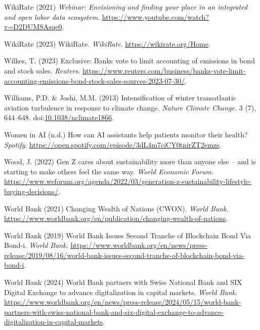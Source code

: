 \documentclass[
  letterpaper,
  DIV=11,
  numbers=noendperiod]{scrartcl}
\newlength{\cslhangindent}
\newenvironment{CSLReferences}[2] %
 {\begin{list}{}{%
  \setlength{\itemindent}{0pt}
  \setlength{\leftmargin}{0pt}
  \setlength{\parsep}{0pt}
  \ifodd #1
   \setlength{\leftmargin}{\cslhangindent}
   \setlength{\itemindent}{-1\cslhangindent}
  \fi
  \setlength{\itemsep}{#2\baselineskip}}}
 {\end{list}}
\begin{document}
\begin{CSLReferences}{0}{1}
WikiRate (2021) \emph{Webinar: {Envisioning} and finding your place in
an integrated and open labor data ecosystem}.
\url{https://www.youtube.com/watch?v=D2DUMSAsqe0}.

WikiRate (2023) {WikiRate}. \emph{WikiRate}.
\url{https://wikirate.org/Home}.

Wilkes, T. (2023) Exclusive: {Banks} vote to limit accounting of
emissions in bond and stock sales. \emph{Reuters}.
\url{https://www.reuters.com/business/banks-vote-limit-accounting-emissions-bond-stock-sales-sources-2023-07-30/}.

Williams, P.D. \& Joshi, M.M. (2013) Intensification of winter
transatlantic aviation turbulence in response to climate change.
\emph{Nature Climate Change}. 3 (7), 644--648.
doi:\href{https://doi.org/10.1038/nclimate1866}{10.1038/nclimate1866}.

Women in AI (n.d.) How can {AI} assistants help patients monitor their
health? \emph{Spotify}.
\url{https://open.spotify.com/episode/3dL4m7ciCY0tnirZT2emzs}.

Wood, J. (2022) Gen {Z} cares about sustainability more than anyone else
-- and is starting to make others feel the same way. \emph{World
Economic Forum}.
\url{https://www.weforum.org/agenda/2022/03/generation-z-sustainability-lifestyle-buying-decisions/}.

World Bank (2021) Changing {Wealth} of {Nations} ({CWON}). \emph{World
Bank}.
\url{https://www.worldbank.org/en/publication/changing-wealth-of-nations}.

World Bank (2019) World {Bank Issues Second Tranche} of {Blockchain Bond
Via Bond-i}. \emph{World Bank}.
\url{https://www.worldbank.org/en/news/press-release/2019/08/16/world-bank-issues-second-tranche-of-blockchain-bond-via-bond-i}.

World Bank (2024) World {Bank} partners with {Swiss National Bank} and
{SIX Digital Exchange} to advance digitalization in capital markets.
\emph{World Bank}.
\url{https://www.worldbank.org/en/news/press-release/2024/05/15/world-bank-partners-with-swiss-national-bank-and-six-digital-exchange-to-advance-digitalization-in-capital-markets}.


\end{CSLReferences}
\end{document}
